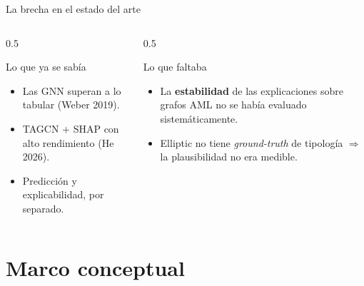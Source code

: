 \documentclass[aspectratio=169,11pt]{beamer}
\begin{document}
\begin{frame}{La brecha en el estado del arte}
\begin{columns}[T]
\begin{column}{0.5\textwidth}
\begin{block}{Lo que ya se sabía}
\begin{itemize}\small
  \item Las GNN superan a lo tabular (Weber 2019).
  \item TAGCN + SHAP con alto rendimiento (He 2026).
  \item Predicción y explicabilidad, por separado.
\end{itemize}
\end{block}
\end{column}
\begin{column}{0.5\textwidth}
\begin{alertblock}{Lo que faltaba}
\begin{itemize}\small
  \item La \textbf{estabilidad} de las explicaciones sobre grafos AML no se había evaluado sistemáticamente.
  \item Elliptic no tiene \textit{ground-truth} de tipología $\Rightarrow$ la plausibilidad no era medible.
\end{itemize}
\end{alertblock}
\end{column}
\end{columns}
\end{frame}

\section{Marco conceptual}
\end{document}
